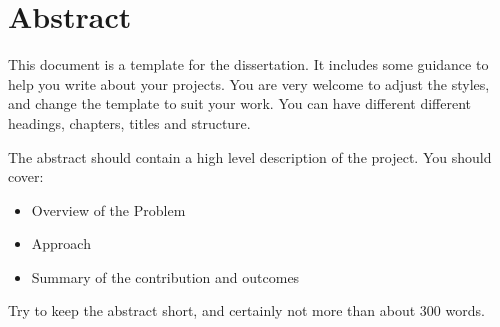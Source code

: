 %
%

\chapter*{Abstract}

\renewcommand{\thepage}{\roman{page}}

This document is a template for the dissertation.  It includes some guidance to
help you write about your projects. You are very welcome to adjust the styles,
and change the template to suit your work.  You can have different different
headings, chapters, titles and structure.

The abstract should contain a high level description of the project.  You
should cover:

\begin{itemize}
  \item Overview of the Problem
  \item Approach
  \item Summary of the contribution and outcomes
\end{itemize}

Try to keep the abstract short, and certainly not more than about 300 words.
